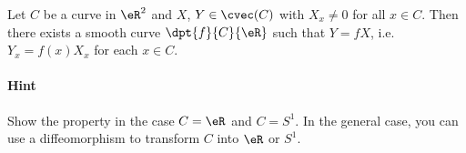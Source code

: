\begin{exercice}\label{exo009}

Let $C$ be a curve in $\eR^2$ and $X$, $Y\in\cvec(C)$ with $X_x\neq 0$ for all $x\in C$. Then there exists a smooth curve $\dpt{ f }{ C }{ \eR }$ such that $Y=fX$, i.e. $Y_x=f(x)X_x$ for each  $x\in C$.

\paragraph{Hint} Show the property in the case $C=\eR$ and $C=S^1$. In the general case, you can use a diffeomorphism to transform $C$ into $\eR$ or $S^1$.

\end{exercice}
